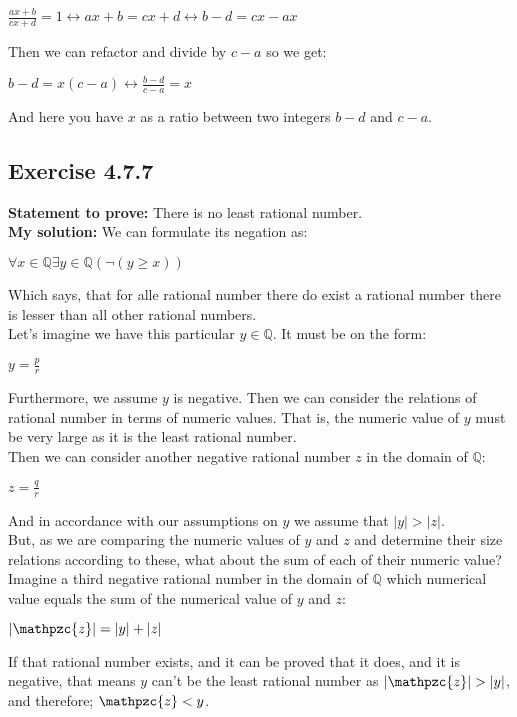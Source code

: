 \documentclass{article}
\newcommand{\cent}[1]{\begin{center}#1\end{center}}
\newcommand{\doubleQ}{\mathbb{Q}}
\newcommand{\In}{\! \in \!}
\newcommand{\script}[1]{\mathpzc{#1}}
\newcommand{\Prove}{\textbf{Statement to prove: }}
\newcommand{\Solution}{\textbf{My solution: }}
\newcommand{\QED}{\boxed{}}
\newcommand{\Exercise}[1]{\subsection{Exercise #1}}
\begin{document}
	\cent{$\frac{ax+b}{cx+d} = 1 \leftrightarrow ax+b = cx+d \leftrightarrow b - d = cx - ax$}
	
	Then we can refactor and divide by $c-a$ so we get:
	
	\cent{$b -d = x(c-a) \leftrightarrow \frac{b-d}{c-a} = x$}
	
	And here you have $x$ as a ratio between two integers $b-d$ and $c-a$.\\
	\QED
	
	\Exercise{4.7.7}
	
	\Prove
	There is no least rational number.\\
	
	\Solution
	We can formulate its negation as:
	
	\cent{$\forall x \In \doubleQ \exists y \in \doubleQ(\neg(y \geq x))$}
	
	Which says, that for alle rational number there do exist a rational number there is lesser than all other rational numbers.\\
	
	Let's imagine we have this particular $y \in \doubleQ$.  It must be on the form:
	
	\cent{$y = \frac{p}{r}$}
	
	Furthermore, we assume $y$ is negative. Then we can consider the relations of rational number in terms of numeric values. That is, the numeric value of $y$ must be very large as it is the least rational number. \\
	
	Then we can consider another negative rational number $z$ in the domain of $\doubleQ$:
	
	\cent{$z = \frac{q}{r}$}
	
	And in accordance with our assumptions on $y$ we assume that $|y| > |z|$.\\
	
	But, as we are comparing the numeric values of $y$ and $z$ and determine their size relations according to these, what about the sum of each of their numeric value?\\
	
	Imagine a third negative rational number in the domain of $\doubleQ$ which numerical value equals the sum of the numerical value of $y$ and $z$:
	
	\cent{$|\script{z}| = |y| + |z|$}
	
	If that rational number exists, and it can be proved that it does, and it is negative, that means $y$ can't be the least rational number as $|\script{z}| > |y|$, and therefore; $\script{z} < y$.\\
	\QED
	
\end{document}
